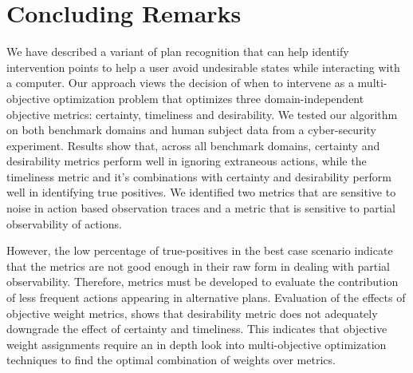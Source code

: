 \section{Concluding Remarks}
We have described a variant of plan recognition that can help identify intervention points to help a user avoid undesirable states while interacting with a computer. Our approach views the decision of when to intervene as a multi-objective optimization problem that optimizes three domain-independent objective metrics: certainty, timeliness and desirability. We tested our algorithm on both benchmark domains and human subject data from a cyber-security experiment. Results show that, across all benchmark domains, certainty and desirability metrics perform well in ignoring extraneous actions, while the timeliness metric and it's combinations with certainty and desirability perform well in identifying true positives. We identified two metrics that are sensitive to noise in action based observation traces and a metric that is sensitive to partial observability of actions.

However, the low percentage of true-positives in the best case scenario indicate that the metrics are not good enough in their raw form in dealing with partial observability. Therefore, metrics must be developed to evaluate the contribution of less frequent actions appearing in alternative plans. Evaluation of the effects of objective weight metrics, shows that desirability metric does not adequately downgrade the effect of certainty and timeliness. This indicates that objective weight assignments require an in depth look into multi-objective optimization techniques to find the optimal combination of weights over metrics.
